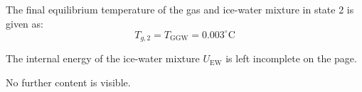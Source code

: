 The final equilibrium temperature of the gas and ice-water mixture in state 2 is given as:  
\[
T_{g,2} = T_{\text{GGW}} = 0.003^\circ\text{C}
\]  

The internal energy of the ice-water mixture \( U_{\text{EW}} \) is left incomplete on the page.  

No further content is visible.